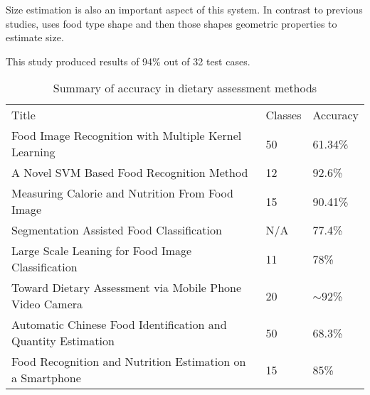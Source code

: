 Size estimation is also an important aspect of this system.
In contrast to previous studies, \textcite{snap} uses food type shape and then those shapes geometric properties to estimate size.

This study produced results of 94\% out of 32 test cases.


\begin{table}[]
\centering
\caption{Summary of accuracy in dietary assessment methods}
\label{other_dietary_summary}
\begin{tabular}{lll}
Title                                                         & Classes & Accuracy   \\
Food Image Recognition with Multiple Kernel Learning          & 50             & 61.34\%    \\
A Novel SVM Based Food Recognition Method                     & 12             & 92.6\%     \\
Measuring Calorie and Nutrition From Food Image               & 15             & 90.41\%    \\
Segmentation Assisted Food Classification                     & N/A            & 77.4\%     \\
Large Scale Leaning for Food Image Classification             & 11             & 78\%       \\
Toward Dietary Assessment via Mobile Phone Video Camera       & 20             & $\sim$92\% \\
Automatic Chinese Food Identification and Quantity Estimation & 50             & 68.3\%     \\
Food Recognition and Nutrition Estimation on a Smartphone      & 15             & 85\%      
\end{tabular}
\end{table}